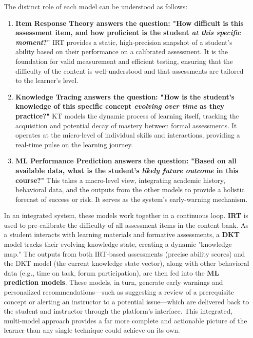 \documentclass{article}
\begin{document}
The distinct role of each model can be understood as follows:
\begin{enumerate}
    \item \textbf{Item Response Theory answers the question: "How difficult is this assessment item, and how proficient is the student \textit{at this specific moment}?"} IRT provides a static, high-precision snapshot of a student's ability based on their performance on a calibrated assessment.\cite{68, 69} It is the foundation for valid measurement and efficient testing, ensuring that the difficulty of the content is well-understood and that assessments are tailored to the learner's level.
    \item \textbf{Knowledge Tracing answers the question: "How is the student's knowledge of this specific concept \textit{evolving over time} as they practice?"} KT models the dynamic process of learning itself, tracking the acquisition and potential decay of mastery between formal assessments.\cite{79, 80} It operates at the micro-level of individual skills and interactions, providing a real-time pulse on the learning journey.
    \item \textbf{ML Performance Prediction answers the question: "Based on all available data, what is the student's \textit{likely future outcome} in this course?"} This takes a macro-level view, integrating academic history, behavioral data, and the outputs from the other models to provide a holistic forecast of success or risk.\cite{84, 85} It serves as the system's early-warning mechanism.
\end{enumerate}

In an integrated system, these models work together in a continuous loop. \textbf{IRT} is used to pre-calibrate the difficulty of all assessment items in the content bank. As a student interacts with learning materials and formative assessments, a \textbf{DKT} model tracks their evolving knowledge state, creating a dynamic "knowledge map." The outputs from both IRT-based assessments (precise ability scores) and the DKT model (the current knowledge state vector), along with other behavioral data (e.g., time on task, forum participation), are then fed into the \textbf{ML prediction models}. These models, in turn, generate early warnings and personalized recommendations—such as suggesting a review of a prerequisite concept or alerting an instructor to a potential issue—which are delivered back to the student and instructor through the platform's interface. This integrated, multi-model approach provides a far more complete and actionable picture of the learner than any single technique could achieve on its own.
\end{document}
